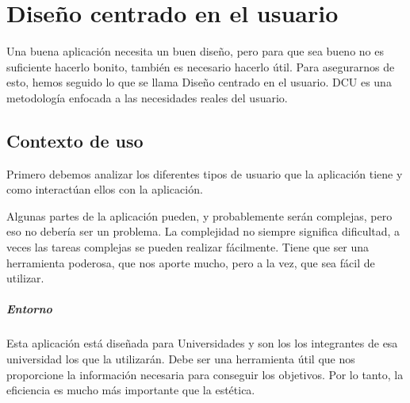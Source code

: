 \section{Diseño centrado en el usuario}
Una buena aplicación necesita un buen diseño, pero para que sea bueno
no es suficiente hacerlo bonito, también es necesario hacerlo
útil. Para asegurarnos de esto, hemos seguido lo que se llama Diseño
centrado en el usuario. DCU es una metodología enfocada a las
necesidades reales del usuario.
\subsection{Contexto de uso}
Primero debemos analizar los diferentes tipos de usuario que la
aplicación tiene y como interactúan ellos con la aplicación.

Algunas partes de la aplicación pueden, y probablemente serán
complejas, pero eso no debería ser un problema. La complejidad no
siempre significa dificultad, a veces las tareas complejas se pueden
realizar fácilmente. Tiene que ser una herramienta poderosa, que nos
aporte mucho, pero a la vez, que sea fácil de utilizar.
\subparagraph{Entorno}
Esta aplicación está diseñada para Universidades y son los los
integrantes de esa universidad los que la utilizarán. Debe ser una
herramienta útil que nos proporcione la información necesaria para
conseguir los objetivos. Por lo tanto, la eficiencia es mucho más
importante que la estética.
